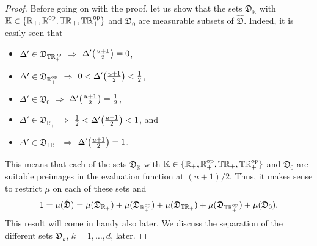 \documentclass[12pt,a4paper,reqno]{amsart}
\theoremstyle{definition}
\newcommand{\mf}[1]{\mathfrak{#1}}
\newcommand{\mb}[1]{\mathbb{#1}}
\newcommand{\R}{\mathbb R}
\newcommand{\T}{\mathbb T}
\let\originalleft\left
\let\originalright\right
\renewcommand{\left}{\mathopen{}\mathclose\bgroup\originalleft}
\renewcommand{\right}{\aftergroup\egroup\originalright}
\begin{document}
\begin{proof}
Before going on with the proof, let us show that the sets $\mf D_{\mb K}$ with $\mb K\in\{\R_+,\R_+^{\rm op},\T\R_+,\T\R_+^{\rm op}\}$ and $\mf D_0$ are measurable subsets of $\hat{\mf D}$. Indeed, it is easily seen that
\begin{itemize}
\item $\Delta'\in\mf D_{\T\R_+^{\rm op}}$ $\Rightarrow$ $\Delta'\left(\frac{u+1}{2}\right)=0$,
\item $\Delta'\in\mf D_{\R_+^{\rm op}}$ $\Rightarrow$ $0<\Delta'\left(\frac{u+1}{2}\right)<\frac{1}{2}$,
\item $\Delta'\in\mf D_0$ $\Rightarrow$ $\Delta'\left(\frac{u+1}{2}\right)=\frac{1}{2}$,
\item $\Delta'\in\mf D_{\R_+}$ $\Rightarrow$ $\frac{1}{2}<\Delta'\left(\frac{u+1}{2}\right)<1$, and
\item $\Delta'\in\mf D_{\T\R_+}$ $\Rightarrow$ $\Delta'\left(\frac{u+1}{2}\right)=1$.
\end{itemize}
This means that each of the sets $\mf D_{\mb K}$ with $\mb K\in\{\R_+,\R_+^{\rm op},\T\R_+,\T\R_+^{\rm op}\}$ and $\mf D_0$ are suitable preimages in the evaluation function at $(u+1)/2$. Thus, it makes sense to restrict $\mu$ on each of these sets and
$$
1=\mu(\hat{\mf D})=\mu(\mf D_{\R_+})+\mu(\mf D_{\R_+^{\rm op}})+\mu(\mf D_{\T\R_+})+\mu(\mf D_{\T\R_+^{\rm op}})+\mu(\mf D_0).
$$
This result will come in handy also later. We discuss the separation of the different sets $\mf D_k$, $k=1,\ldots,d$, later.


\end{proof}
\end{document}
